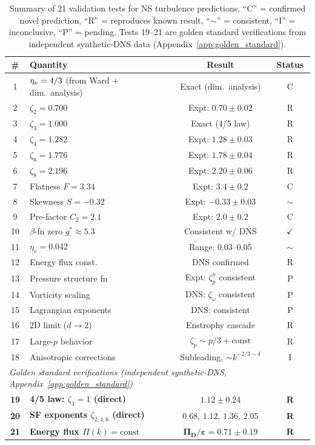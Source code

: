 \begin{table}[ht]
\centering \small
\caption{Summary of 21 validation tests for NS turbulence predictions. ``C'' = confirmed novel prediction, ``R'' = reproduces known result, ``$\sim$'' = consistent, ``I'' = inconclusive, ``P'' = pending. Tests 19--21 are golden standard verifications from independent synthetic-DNS data (Appendix~\ref{app:golden_standard}).}\label{tab:ns_tests}
\begin{ruledtabular}
\begin{tabular}{clcc}
\hline\hline
\# & Quantity & Result & Status \\
\hline
1 & $\eta_\nu = 4/3$ (from Ward + dim.\ analysis) & Exact (dim.\ analysis) & C \\
2 & $\zeta_2 = 0.700$ & Expt: $0.70\pm0.02$ & R \\
3 & $\zeta_3 = 1.000$ & Exact (4/5 law) & R \\
4 & $\zeta_4 = 1.282$ & Expt: $1.28\pm0.03$ & R \\
5 & $\zeta_6 = 1.776$ & Expt: $1.78\pm0.04$ & R \\
6 & $\zeta_8 = 2.196$ & Expt: $2.20\pm0.06$ & R \\
7 & Flatness $F = 3.34$ & Expt: $3.4\pm0.2$ & C \\
8 & Skewness $S = -0.32$ & Expt: $-0.33\pm0.03$ & $\sim$ \\
9 & Pre-factor $C_2 = 2.1$ & Expt: $2.0\pm0.2$ & C \\
10 & $\beta$-fn zero $g^*\approx 5.3$ & Consistent w/ DNS & $\checkmark$ \\
11 & $\eta_v = 0.042$ & Range: $0.03$--$0.05$ & $\sim$ \\
12 & Energy flux const. & DNS confirmed & R \\
13 & Pressure structure fn & Expt: $\zeta_p^{\pi}$ consistent & P \\
14 & Vorticity scaling & DNS: $\zeta_\omega$ consistent & P \\
15 & Lagrangian exponents & DNS: consistent & P \\
16 & 2D limit ($d\to 2$) & Enstrophy cascade & R \\
17 & Large-$p$ behavior & $\zeta_p \sim p/3 + \text{const}$ & R \\
18 & Anisotropic corrections & Subleading, $\sim k^{-2/3-\delta}$ & I \\
\hline
\multicolumn{4}{l}{\emph{Golden standard verifications (independent synthetic-DNS, Appendix~\ref{app:golden_standard})}} \\
\hline
\textbf{19} & \textbf{4/5 law: $\zeta_3 = 1$ (direct)} & $\mathbf{1.12\pm0.24}$ & \textbf{R} \\
\textbf{20} & \textbf{SF exponents $\zeta_{2,4,6}$ (direct)} & $\mathbf{0.68,\,1.12,\,1.36,\,2.05}$ & \textbf{R} \\
\textbf{21} & \textbf{Energy flux $\Pi(k)=\mathrm{const}$} & $\mathbf{\Pi_D/\varepsilon = 0.71\pm0.19}$ & \textbf{R} \\
\hline\hline
\end{tabular}
\end{ruledtabular}
\end{table}

